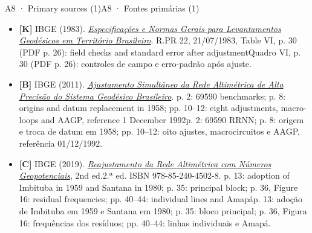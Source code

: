 \documentclass[aspectratio=169,11pt]{beamer}
\newcommand{\tr}[2]{\ifEN#2\else#1\fi}
\begin{document}
\begin{frame}{\tr{A8 · Fontes primárias (1)}{A8 · Primary sources (1)}}
  \scriptsize
  \begin{itemize}
    \setlength{\itemsep}{6pt}
    \item \textbf{[K]} IBGE (1983).
    \href{https://geoftp.ibge.gov.br/metodos_e_outros_documentos_de_referencia/normas/legisla_resolucao_d.pdf}{\emph{Especificações e Normas Gerais para Levantamentos Geodésicos em Território Brasileiro}}.
    R.PR 22, 21/07/1983, \tr{Quadro VI, p. 30 (PDF p. 26): controles de campo e erro-padrão após ajuste}{Table VI, p. 30 (PDF p. 26): field checks and standard error after adjustment}.

    \item \textbf{[B]} IBGE (2011).
    \href{https://geoftp.ibge.gov.br/metodos_e_outros_documentos_de_referencia/outros_documentos_tecnicos/apresentacoes_artigos/relatorioajustamento.pdf}{\emph{Ajustamento Simultâneo da Rede Altimétrica de Alta Precisão do Sistema Geodésico Brasileiro}}.
    \tr{p. 2: \num{69590} RRNN; p. 8: origem e troca de datum em 1958;
    pp. 10--12: oito ajustes, macrocircuitos e AAGP, referência 01/12/1992}{
    p. 2: \num{69590} benchmarks; p. 8: origins and datum replacement in 1958;
    pp. 10--12: eight adjustments, macro-loops and AAGP, reference 1 December 1992}.

    \item \textbf{[C]} IBGE (2019).
    \href{https://biblioteca.ibge.gov.br/visualizacao/livros/liv101666.pdf}{\emph{Reajustamento da Rede Altimétrica com Números Geopotenciais}}, \tr{2.ª ed.}{2nd ed.}
    ISBN 978-85-240-4502-8.
    \tr{p. 13: adoção de Imbituba em 1959 e Santana em 1980; p. 35: bloco principal;
    p. 36, Figura 16: frequências dos resíduos; pp. 40--44: linhas individuais e Amapá}{
    p. 13: adoption of Imbituba in 1959 and Santana in 1980; p. 35: principal block;
    p. 36, Figure 16: residual frequencies; pp. 40--44: individual lines and Amapá}.
  \end{itemize}
\end{frame}
\end{document}

